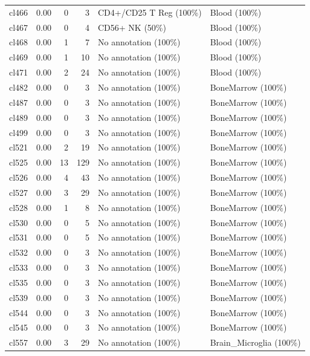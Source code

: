 \begin{table}[ht!]
\begin{tabular}{lrrrll}
  cl466 & 0.00 &   0 &   3 & CD4+/CD25 T Reg (100\%) & Blood (100\%) \\ 
  cl467 & 0.00 &   0 &   4 & CD56+ NK (50\%) & Blood (100\%) \\ 
  cl468 & 0.00 &   1 &   7 & No annotation (100\%) & Blood (100\%) \\ 
  cl469 & 0.00 &   1 &  10 & No annotation (100\%) & Blood (100\%) \\ 
  cl471 & 0.00 &   2 &  24 & No annotation (100\%) & Blood (100\%) \\ 
  cl482 & 0.00 &   0 &   3 & No annotation (100\%) & BoneMarrow (100\%) \\ 
  cl487 & 0.00 &   0 &   3 & No annotation (100\%) & BoneMarrow (100\%) \\ 
  cl489 & 0.00 &   0 &   3 & No annotation (100\%) & BoneMarrow (100\%) \\ 
  cl499 & 0.00 &   0 &   3 & No annotation (100\%) & BoneMarrow (100\%) \\ 
  cl521 & 0.00 &   2 &  19 & No annotation (100\%) & BoneMarrow (100\%) \\ 
  cl525 & 0.00 &  13 & 129 & No annotation (100\%) & BoneMarrow (100\%) \\ 
  cl526 & 0.00 &   4 &  43 & No annotation (100\%) & BoneMarrow (100\%) \\ 
  cl527 & 0.00 &   3 &  29 & No annotation (100\%) & BoneMarrow (100\%) \\ 
  cl528 & 0.00 &   1 &   8 & No annotation (100\%) & BoneMarrow (100\%) \\ 
  cl530 & 0.00 &   0 &   5 & No annotation (100\%) & BoneMarrow (100\%) \\ 
  cl531 & 0.00 &   0 &   5 & No annotation (100\%) & BoneMarrow (100\%) \\ 
  cl532 & 0.00 &   0 &   3 & No annotation (100\%) & BoneMarrow (100\%) \\ 
  cl533 & 0.00 &   0 &   3 & No annotation (100\%) & BoneMarrow (100\%) \\ 
  cl535 & 0.00 &   0 &   3 & No annotation (100\%) & BoneMarrow (100\%) \\ 
  cl539 & 0.00 &   0 &   3 & No annotation (100\%) & BoneMarrow (100\%) \\ 
  cl544 & 0.00 &   0 &   3 & No annotation (100\%) & BoneMarrow (100\%) \\ 
  cl545 & 0.00 &   0 &   3 & No annotation (100\%) & BoneMarrow (100\%) \\ 
  cl557 & 0.00 &   3 &  29 & No annotation (100\%) & Brain\_Microglia (100\%) \\ 

\end{tabular}
\end{table}
